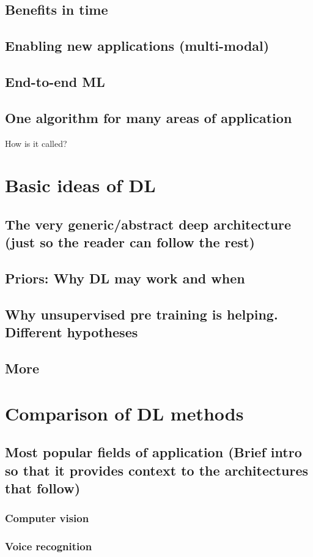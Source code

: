 \documentclass[]{article}
\begin{document}
	\subsection{Benefits in time}
	\subsection{Enabling new applications (multi-modal)}
	\subsection{End-to-end ML}
	\subsection{One algorithm for many areas of application}
	How is it called?
\section{Basic ideas of DL}
	\subsection{The very generic/abstract deep architecture (just so the reader can follow the rest)}
	\subsection{Priors: Why DL may work and when}
	\subsection{Why unsupervised pre training is helping. Different hypotheses}	
	\subsection{More}
\section{Comparison of DL methods}
	\subsection{Most popular fields of application (Brief intro so that it provides context to the architectures that follow)}
		\subsubsection{Computer vision}
		\subsubsection{Voice recognition}
\end{document}

